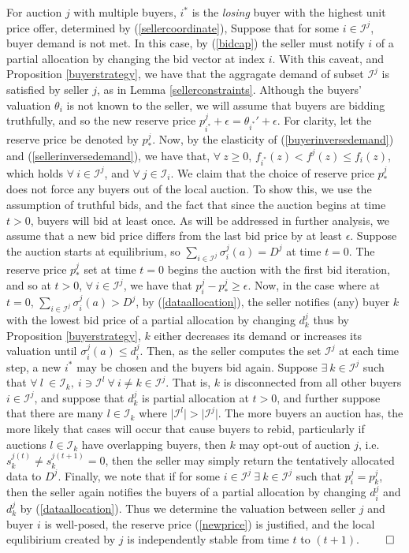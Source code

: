 \documentclass[sigconf, anonymous]{acmart}
\newcommand{\mcI}{\mathcal{I}}
\newcommand{\g}{\sigma}
\theoremstyle{definition}
\begin{document}
For auction $j$ with multiple buyers, $i^*$ is the \emph{losing} buyer with the highest unit
price offer, determined by (\ref{sellercoordinate}), 
Suppose that for some $i\in\mcI^j$, buyer demand is not met. 
In this case, by (\ref{bidcap}) the seller must notify $i$ of a
partial allocation by changing the bid vector at index $i$.
With this caveat, and Proposition \ref{buyerstrategy}, we have that the
aggragate demand of subset $\mcI^j$ is satisfied by seller $j$, as in Lemma
\ref{sellerconstraints}.
Although the buyers' valuation $\theta_i$ is not known to the seller, we will assume
that buyers are bidding truthfully, and so the new reserve price $p_{i^*}^j +
\epsilon ={\theta_{i^*}}' + \epsilon$. For clarity, let the reserve price be denoted by
$p_*^j$.
Now, by the elasticity of (\ref{buyerinversedemand}) and
(\ref{sellerinversedemand}), we have that, $\forall \ z\ge 0$,
$f_{i^*}(z) < f^j(z) \le f_i(z)$,
which holds $\forall \ i \in \mcI^j$, and $\forall \ j \in \mcI_i$.
We claim that the choice of reserve price $p_*^j$ does not force any buyers out
of the local auction. To show this, we use the assumption of truthful bids, and
the fact that since the auction begins at time $t>0$, buyers will
bid at least once. As will be addressed in further analysis, we assume
that a new bid price differs from the last bid price by at least
$\epsilon$. Suppose the auction starts at equilibrium, so $\sum_{i\in\mcI^j}
\g_i^j(a) = D^j$ at time $t=0$. The reserve price $p_*^j$ set at time $t=0$
begins the auction with the first bid iteration, and so at $t>0$, $\forall \ i \in
\mcI^j$, we have that $p_i^j - p_*^j \ge \epsilon$.
Now, in the case where at $t=0$, $\sum_{i\in\mcI^j} \g_i^j(a) > D^j$, by
(\ref{dataallocation}), the seller notifies (any) buyer $k$ with the lowest bid
price of a partial allocation by changing
$d_k^j$ thus by Proposition \ref{buyerstrategy}, $k$ either decreases its
demand or increases its valuation until
$\g_i^j(a) \le d_i^j$. Then, as the seller computes the set $\mcI^j$ at each time
step, a new $i^*$ may be chosen and the buyers bid again.
Suppose $\exists \ k \in \mcI^j$ such that $\forall \ l \ \in
\mcI_k, \ i\ni \mcI^l \ \forall \ i\ne k\in\mcI^j$. That is, $k$ is
disconnected from all other buyers $i\in\mcI^j$, and suppose that $d_k^j$
is partial allocation at $t>0$, and further suppose that there are many
$l\in\mcI_k$ where $\vert \mcI^l\vert > \vert\mcI^j\vert$. The more buyers an
auction has, the more likely that cases will occur that cause buyers to rebid,
particularly if auctions $l\in\mcI_k$ have overlapping buyers, then $k$ may
opt-out of auction $j$, i.e. $s_k^{j(t)} \ne s_k^{j(t+1)} =
0$, then the seller may simply return the tentatively allocated data to $D^j$.
Finally, we note that if for some $i\in\mcI^j \ \exists \ k\in\mcI^j$
such that $p_{i}^j = p_k^j$, then the seller again notifies the buyers of a
partial
allocation by changing $d_i^j$ and $d_k^j$ by (\ref{dataallocation}).
Thus we determine the valuation between seller
$j$ and buyer $i$ is well-posed, the reserve price (\ref{newprice}) is justified, and the local
equlibirium created by $j$ is independently stable from time $t$ to $(t+1)$. 
$\qed$
\end{document}
